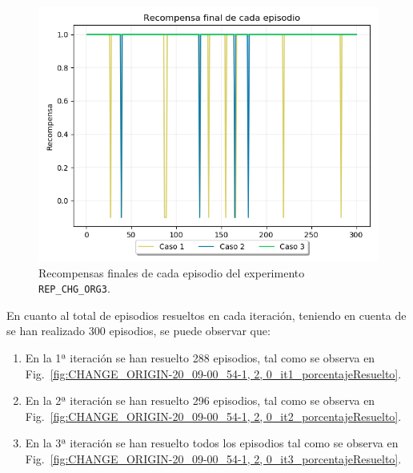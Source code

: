 \begin{figure}
    \centering
    \includegraphics[scale=0.4]{cap5_experimentacion/images/CHANGE_ORIGIN-20_09-00_54-1, 2, 0_recompensa.png}
    \caption{Recompensas finales de cada episodio del experimento \texttt{REP\_CHG\_ORG3}.}
    \label{fig:CHANGE_ORIGIN-20_09-00_54-1, 2, 0_recompensa}
\end{figure}

En cuanto al total de episodios resueltos en cada iteración, teniendo en cuenta de se han realizado 300 episodios, se puede observar que: 
\begin{enumerate}
    \item En la 1ª iteración se han resuelto 288 episodios, tal como se observa en Fig.~\ref{fig:CHANGE_ORIGIN-20_09-00_54-1, 2, 0_it1_porcentajeResuelto}.
    \item En la 2ª iteración se han resuelto 296 episodios, tal como se observa en Fig.~\ref{fig:CHANGE_ORIGIN-20_09-00_54-1, 2, 0_it2_porcentajeResuelto}.
    \item En la 3ª iteración se han resuelto todos los episodios tal como se observa en Fig.~\ref{fig:CHANGE_ORIGIN-20_09-00_54-1, 2, 0_it3_porcentajeResuelto}.
\end{enumerate}

